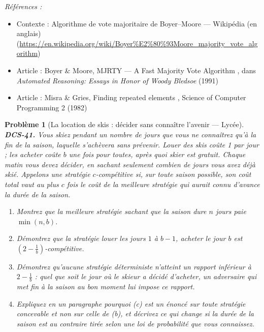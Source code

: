 \documentclass[11pt]{article}
\newtheorem{problem}{Problème}
\newenvironment{refs}{\par\small\noindent\emph{Références :}\begin{itemize}\setlength\itemsep{0pt}}{\end{itemize}\normalsize}
\begin{document}
\begin{refs}
\item Contexte : Algorithme de vote majoritaire de Boyer--Moore --- Wikipédia (en anglais) (\url{https://en.wikipedia.org/wiki/Boyer%E2%80%93Moore_majority_vote_algorithm})
\item Article : Boyer \& Moore, \og{} MJRTY --- A Fast Majority Vote Algorithm \fg{}, dans \textit{Automated Reasoning: Essays in Honor of Woody Bledsoe} (1991)
\item Article : Misra \& Gries, \og{} Finding repeated elements \fg{}, Science of Computer Programming 2 (1982)
\end{refs}

\bigskip

\begin{problem}[{La location de skis : décider sans connaître l'avenir --- Lycée}]
\textbf{DCS-41.} Vous skiez pendant un nombre de jours que vous ne connaîtrez qu'à la fin de la saison, laquelle s'achèvera sans prévenir. Louer des skis coûte 1 par jour ; les acheter coûte $ b $ une fois pour toutes, après quoi skier est gratuit. Chaque matin vous devez décider, en sachant seulement combien de jours vous avez déjà skié. Appelons une stratégie $ c $-\textit{compétitive} si, sur toute saison possible, son coût total vaut au plus $ c $ fois le coût de la meilleure stratégie qui aurait connu d'avance la durée de la saison.
\begin{enumerate}
\item[(a)] Montrez que la meilleure stratégie sachant que la saison dure $ n $ jours paie $ \min(n, b) $.
\item[(b)] Démontrez que la stratégie \og{} louer les jours $ 1 $ à $ b-1 $, acheter le jour $ b $ \fg{} est $ \left(2 - \frac{1}{b}\right) $-compétitive.
\item[(c)] Démontrez qu'aucune stratégie déterministe n'atteint un rapport inférieur à $ 2 - \frac{1}{b} $ : quel que soit le jour où le skieur a décidé d'acheter, un adversaire qui met fin à la saison au bon moment lui impose ce rapport.
\item[(d)] Expliquez en un paragraphe pourquoi (c) est un énoncé sur toute stratégie concevable et non sur celle de (b), et décrivez ce qui change si la durée de la saison est au contraire tirée selon une loi de probabilité que vous connaissez.
\end{enumerate}

\end{problem}
\end{document}
